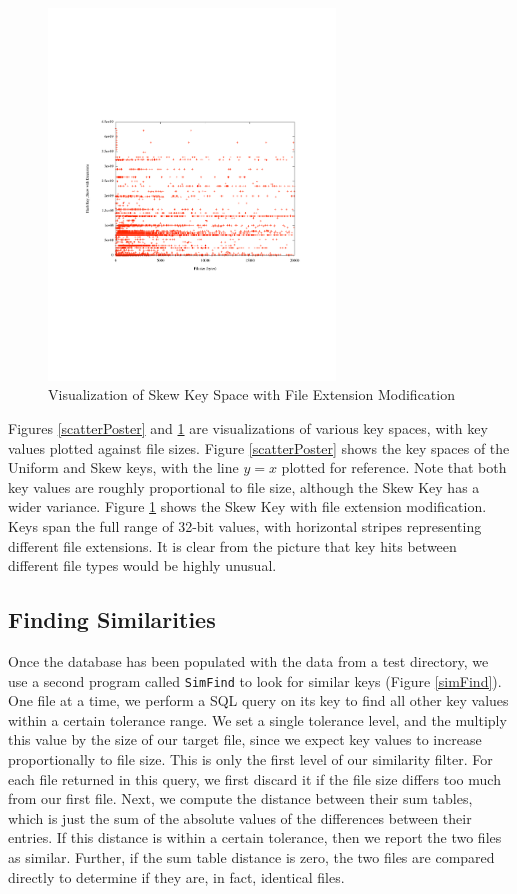 \documentclass[10pt, twocolumn]{article}
\begin{document}
 \begin{figure}[h] 
 \centering
\includegraphics[width= 3in]{skewExtScatter.pdf}
\caption{Visualization of  Skew Key Space with File Extension Modification}
\label{scatterExtension} 
\end{figure}   

Figures \ref{scatterPoster} and \ref{scatterExtension} are visualizations of various key spaces, with key values plotted against file sizes.  Figure \ref{scatterPoster} shows the key spaces of the Uniform and Skew keys, with the line $y=x$ plotted for reference.  Note that both key values are roughly proportional to file size, although the Skew Key has a wider variance.  Figure \ref{scatterExtension} shows the Skew Key with file extension modification.  Keys span the full range of 32-bit values, with horizontal stripes representing different file extensions.  It is clear from the picture that key hits between different file types would be highly unusual.



\subsection{Finding Similarities}

Once the database has been populated with the data from a test directory, we use a second program called {\tt SimFind} to look for similar keys (Figure \ref{simFind}).  One file at a time, we perform a SQL query on its key to find all other key values within a certain tolerance range.  We set a single tolerance level, and the multiply this value by the size of our target file, since we expect key values to increase proportionally to file size.  This is only the first level of our similarity filter.  For each file returned in this query, we first discard it if the file size differs too much from our first file.  Next, we compute the distance between their sum tables, which is just the sum of the absolute values of the differences between their entries.  If this distance is within a certain tolerance, then we report the two files as similar.  Further, if the sum table distance is zero, the two files are compared directly to determine if they are, in fact, identical files.
\end{document}
